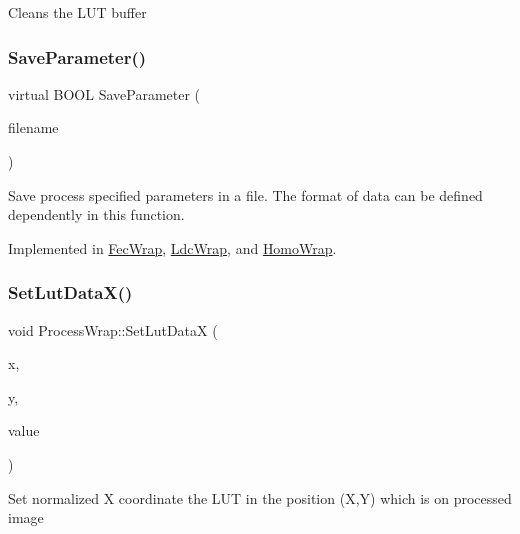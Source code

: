 Cleans the L\+UT buffer \mbox{\label{class_process_wrap_aa5d4361a42a7a65cac877beb6d4ffa97}} 
\subsubsection{\texorpdfstring{Save\+Parameter()}{SaveParameter()}}
{\footnotesize\ttfamily virtual B\+O\+OL Save\+Parameter (\begin{DoxyParamCaption}\item[{L\+P\+C\+T\+S\+TR}]{filename }\end{DoxyParamCaption})\hspace{0.3cm}{\ttfamily [pure virtual]}}

Save process specified parameters in a file. The format of data can be defined dependently in this function. 

Implemented in \mbox{\hyperlink{class_fec_wrap_abd377e205b42ec6725293c3c9ff76a34}{Fec\+Wrap}}, \mbox{\hyperlink{class_ldc_wrap_aafd5595ef17a6be3074186204c39a550}{Ldc\+Wrap}}, and \mbox{\hyperlink{class_homo_wrap_aafd5595ef17a6be3074186204c39a550}{Homo\+Wrap}}.

\mbox{\label{class_process_wrap_a8e4e346bc28b54e1f789ed6c7d3cd0f4}} 
\subsubsection{\texorpdfstring{Set\+Lut\+Data\+X()}{SetLutDataX()}}
{\footnotesize\ttfamily void Process\+Wrap\+::\+Set\+Lut\+DataX (\begin{DoxyParamCaption}\item[{int}]{x,  }\item[{int}]{y,  }\item[{double}]{value }\end{DoxyParamCaption})\hspace{0.3cm}{\ttfamily [inline]}}

Set normalized X coordinate the L\+UT in the position (X,Y) which is on processed image \mbox{\label{class_process_wrap_a86c91328a42d3a3bee76507595050fd1}} 
